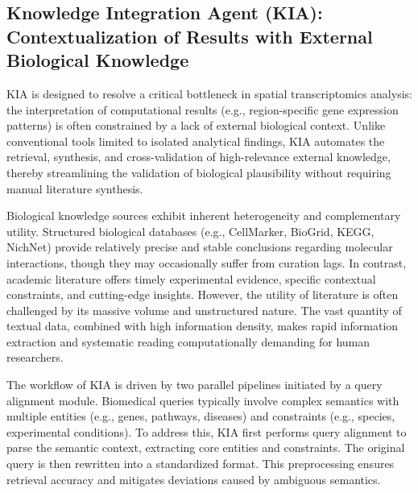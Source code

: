 \documentclass[11pt,a4paper]{article}
\begin{document}
\subsection{Knowledge Integration Agent (KIA): Contextualization of Results with External Biological Knowledge}

KIA is designed to resolve a critical bottleneck in spatial transcriptomics analysis: the interpretation of computational results (e.g., region-specific gene expression patterns) is often constrained by a lack of external biological context. Unlike conventional tools limited to isolated analytical findings, KIA automates the retrieval, synthesis, and cross-validation of high-relevance external knowledge, thereby streamlining the validation of biological plausibility without requiring manual literature synthesis.

Biological knowledge sources exhibit inherent heterogeneity and complementary utility. Structured biological databases (e.g., CellMarker, BioGrid, KEGG, NichNet) provide relatively precise and stable conclusions regarding molecular interactions, though they may occasionally suffer from curation lags. In contrast, academic literature offers timely experimental evidence, specific contextual constraints, and cutting-edge insights. However, the utility of literature is often challenged by its massive volume and unstructured nature. The vast quantity of textual data, combined with high information density, makes rapid information extraction and systematic reading computationally demanding for human researchers.


The workflow of KIA is driven by two parallel pipelines initiated by a query alignment module. Biomedical queries typically involve complex semantics with multiple entities (e.g., genes, pathways, diseases) and constraints (e.g., species, experimental conditions). To address this, KIA first performs query alignment to parse the semantic context, extracting core entities and constraints. The original query is then rewritten into a standardized format. This preprocessing ensures retrieval accuracy and mitigates deviations caused by ambiguous semantics.
\end{document}

